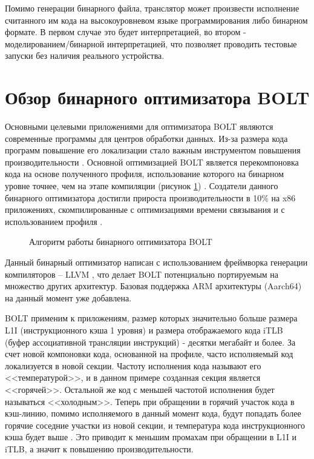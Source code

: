 Помимо генерации бинарного файла, транслятор может произвести исполнение считанного им кода на высокоуровневом языке программирования либо бинарном формате. В первом случае это будет интерпретацией, во втором - моделированием/бинарной интерпретацией, что позволяет проводить тестовые запуски без наличия реального устройства.

\section{Обзор бинарного оптимизатора BOLT}\label{sec:ch1/sec3}
Основными целевыми приложениями для оптимизатора BOLT являются современные программы для центров обработки данных. Из-за размера кода программ повышение его локализации стало важным инструментом повышения производительности \cite{Ottoni2017}. Основной оптимизацией BOLT является перекомпоновка кода на основе полученного профиля, использование которого на бинарном уровне точнее, чем на этапе компиляции (рисунок \cref{fig:BOLT}) \cite{Newell2020}. Создатели данного бинарного оптимизатора достигли прироста производительности в 10\% на x86 приложениях, скомпилированные с оптимизациями времени связывания и с использованием профиля \cite{Panchenko2019}\cite{Panchenko2021}.

\begin{figure}[!h]
    \centerfloat{
        \texttt{[image: 1]}
    }
    \caption{Алгоритм работы бинарного оптимизатора BOLT}\label{fig:BOLT}
\end{figure}

Данный бинарный оптимизатор написан с использованием фреймворка генерации компиляторов – LLVM \cite{Lattner2004}, что делает BOLT потенциально портируемым на множество других архитектур. Базовая поддержка ARM архитектуры (Aarch64) на данный момент уже добавлена.

BOLT применим к приложениям, размер которых значительно больше размера L1I (инструкционного кэша 1 уровня) и размера отображаемого кода iTLB (буфер ассоциативной трансляции инструкций) - десятки мегабайт и более. За счет новой компоновки кода, основанной на профиле, часто исполняемый код локализуется в новой секции. Частоту исполнения кода называют его <<температурой>>, и в данном примере созданная секция является <<горячей>>. Остальной же код с меньшей частотой исполнения будет называться <<холодным>>. Теперь при обращении в горячий участок кода в кэш-линию, помимо исполняемого в данный момент кода, будут попадать более горячие соседние участки из новой секции, и температура кода инструкционного кэша будет выше \cite{Lavaee2019}. Это приводит к меньшим промахам при обращении в L1I и iTLB, а значит к повышению производительности.

